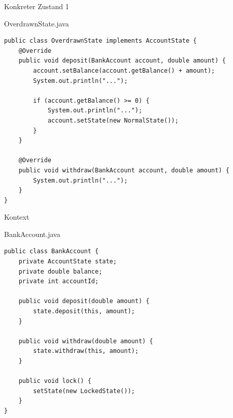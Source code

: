 \begin{frame}[fragile]{Konkreter Zustand 1}
	\begin{exampleblock}{OverdrawnState.java}
 		\begin{lstlisting}
public class OverdrawnState implements AccountState {
    @Override
    public void deposit(BankAccount account, double amount) {
        account.setBalance(account.getBalance() + amount);
        System.out.println("...");

        if (account.getBalance() >= 0) {
            System.out.println("...");
            account.setState(new NormalState());
        }
    }

    @Override
    public void withdraw(BankAccount account, double amount) {
        System.out.println("...");
    }
}
 		\end{lstlisting}
 	\end{exampleblock}
\end{frame}


\begin{frame}[fragile]{Kontext}
	\begin{exampleblock}{BankAccount.java}
 		\begin{lstlisting}
public class BankAccount {
    private AccountState state;
    private double balance;
    private int accountId;

    public void deposit(double amount) {
        state.deposit(this, amount);
    }

    public void withdraw(double amount) {
        state.withdraw(this, amount);
    }

    public void lock() {
        setState(new LockedState());
    }
}
 		\end{lstlisting}
 	\end{exampleblock}
\end{frame}